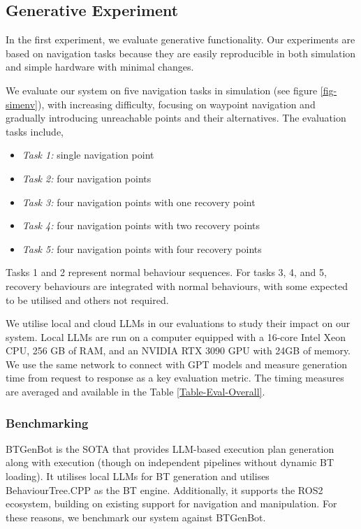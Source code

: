 \documentclass[letterpaper, 10pt, conference]{ieeeconf}      %
\begin{document}
\subsection{Generative Experiment}

In the first experiment, we evaluate generative functionality. Our experiments are based on navigation tasks because they are easily reproducible in both simulation and simple hardware with minimal changes. 

We evaluate our system on five navigation tasks in simulation (see figure \ref{fig-simenv}), with increasing difficulty, focusing on waypoint navigation and gradually introducing unreachable points and their alternatives. The evaluation tasks include,

\begin{itemize}
    \item \textit{Task 1:} single navigation point
    \item \textit{Task 2:} four navigation points
    \item \textit{Task 3:} four navigation points with one recovery point
    \item \textit{Task 4:} four navigation points with two recovery points
    \item \textit{Task 5:} four navigation points with four recovery points
\end{itemize}

Tasks 1 and 2 represent normal behaviour sequences. For tasks 3, 4, and 5, recovery behaviours are integrated with normal behaviours, with some expected to be utilised and others not required.

We utilise local and cloud LLMs in our evaluations to study their impact on our system. Local LLMs are run on a computer equipped with a 16-core Intel Xeon CPU, 256 GB of RAM, and an NVIDIA RTX 3090 GPU with 24GB of memory. We use the same network to connect with GPT models and measure generation time from request to response as a key evaluation metric. The timing measures are averaged and available in the Table \ref{Table-Eval-Overall}.

\subsubsection{Benchmarking}

BTGenBot \cite{izzo_btgenbot_2024} is the SOTA that provides LLM-based execution plan generation along with execution (though on independent pipelines without dynamic BT loading). It utilises local LLMs for BT generation and utilises BehaviourTree.CPP \cite{ghzouli_behavior_2023} as the BT engine. Additionally, it supports the ROS2 ecosystem, building on existing support for navigation and manipulation. For these reasons, we benchmark our system against BTGenBot.
\end{document}

